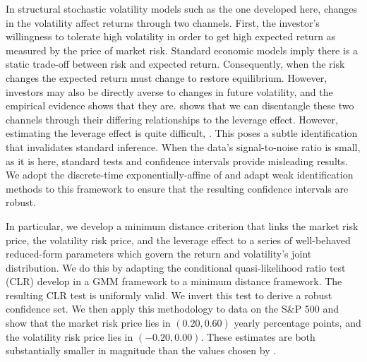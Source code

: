 \documentclass[11pt, letterpaper, twoside]{article}
\begin{document}
In structural stochastic volatility models such as the one developed here, changes in the volatility affect returns through two channels. First, the investor's willingness to tolerate high volatility in order to get high expected return as measured by the price of market risk. Standard economic models  imply there is a static trade-off between risk and expected return. Consequently, when the risk changes the expected return must change to restore equilibrium. However, investors may also be directly averse to changes in future volatility, and the empirical evidence shows that they are. \Textcite{han2018leverage} shows that we can disentangle these two channels through their differing relationships to the leverage effect. However, estimating the leverage effect is quite difficult, \parencite{aitsahalia2013leverage}. This poses a subtle identification that invalidates standard inference. When the data's signal-to-noise ratio is small, as it is here, standard tests and confidence intervals provide misleading results. We adopt the discrete-time exponentially-affine  of \textcite{han2018leverage} and adapt weak identification methods  to this framework to ensure that the resulting confidence intervals are robust.

In particular, we develop a minimum distance criterion that links the market risk price, the volatility risk price, and the leverage effect to a series of well-behaved reduced-form parameters which govern the return and volatility's joint distribution. We do this by adapting the conditional quasi-likelihood ratio test (CLR) \textcite{andrews2016conditional} develop in a GMM framework to a minimum distance framework. The resulting CLR test is uniformly valid. We invert this test to derive a robust confidence set. We then apply this methodology to data on the S\&P 500 and show that the market risk price lies in $(0.20, 0.60)$ yearly percentage points, and the volatility risk price lies in $(-0.20, 0.00)$. These estimates are both substantially smaller in magnitude than the values chosen by  \textcite{han2018leverage}.


\clearpage


{}
\printbibliography
\clearpage
\end{document}
